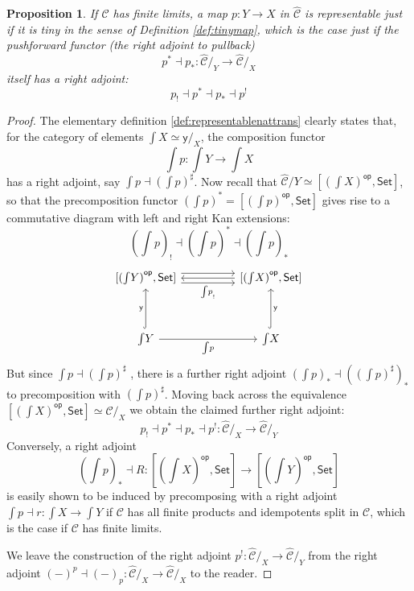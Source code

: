 \documentclass[12pt,reqno]{amsart}
\newcommand{\CC}{\ensuremath{\mathcal{C}}}
\newcommand{\op}[1]{\ensuremath{{#1}^{\mathsf{op}}}}
\newcommand{\psh}[1]{\ensuremath{[\op{#1},\mathsf{Set}]}}
\newcommand{\y}{\ensuremath{\mathsf{y}}} %
\renewcommand{\to}{\ensuremath{\rightarrow}}
\newcommand{\too}{\ensuremath{\longrightarrow}}
\newtheorem{proposition}[theorem]{Proposition}
\theoremstyle{remark}
\theoremstyle{definition}
\begin{document}
\begin{proposition}\label{prop:rep_is_tiny}
If $\CC$ has finite limits, a map $p : Y \to X$ in $\widehat{\CC}$ is representable just if it is tiny in the sense of Definition \ref{def:tinymap}, which is the case just if the \emph{pushforward functor} (the right adjoint to pullback) 
\[
p^* \dashv p_* : \widehat{\CC}/_{Y} \longrightarrow \widehat{\CC}/_{X}
\] 
itself has a \emph{right} adjoint:
\[
p_! \dashv p^*\dashv p_* \dashv  p^!
\]
\end{proposition}

\begin{proof}
The elementary definition \ref{def:representablenattrans} clearly states that, for the category of elements ${\int\!X} \simeq {\y{}/_X}$, the composition functor 
\[\textstyle
{\int\!p} : {\int\!Y} \to {\int\!X}
\]  
has a right adjoint, say ${\int\!p} \dashv ({\int\!p})^\sharp$. Now recall that $\widehat{\CC}/{Y} \simeq \psh{(\int\!X)}$, so that the precomposition functor $({\int\!p})^* = \psh{({\int\!p})}$ gives rise to a commutative diagram with left and right Kan extensions:
\[\textstyle
({\int\!p})_!\dashv ({\int\!p})^* \dashv ({\int\!p})_*
\]
%
\begin{equation}\begin{tikzcd}
\psh{(\int{\!Y})} \ar[rr,shift right = 1ex,swap, "{\int\!p}_!"]  \ar[rr,shift left = 1ex] &&   \psh{(\int{\!X})} \ar[ll] \\
&& \\
\int{\!Y} \ar[uu, hook, "{\y{}}"]  \ar[rr, swap, "{\int\!p}"]  &&  \int{\!X} \ar[uu, swap,hook, "{\y{}}"]
\end{tikzcd}\end{equation}
%
But since ${\int\!p} \dashv ({\int\!p})^\sharp$ , there is a further right adjoint $({\int\!p})_* \dashv (({\int\!p})^\sharp)_*$ to precomposition with $({\int\!p})^\sharp$.  Moving back across the equivalence $\psh{(\int\!X)} \simeq \widehat{\CC}/_{X}$ we obtain the claimed further right adjoint: 
\[
p_! \dashv p^* \dashv p_*\dashv p^! :  \widehat{\CC}/_{X} \too \widehat{\CC}/_{Y}
\]
%
Conversely, a right adjoint $$\textstyle ({\int\!p})_* \dashv R : \psh{(\int{\!X})} \to \psh{(\int{\!Y})}$$ is easily shown to be induced by precomposing with a right adjoint ${\int\!p} \dashv r : {\int\!X} \to {\int\!Y}$ if $\CC$ has all finite products and idempotents split in $\CC$, which is the case if $\CC$ has finite limits.

We leave the construction of the right adjoint $p^!:  \widehat{\CC}/_{X} \too \widehat{\CC}/_{Y}$ from the right adjoint $(-)^p \dashv (-)_p : \widehat{\CC}/_{X} \to \widehat{\CC}/_{X}$ to the reader.
\end{proof}
\end{document}
